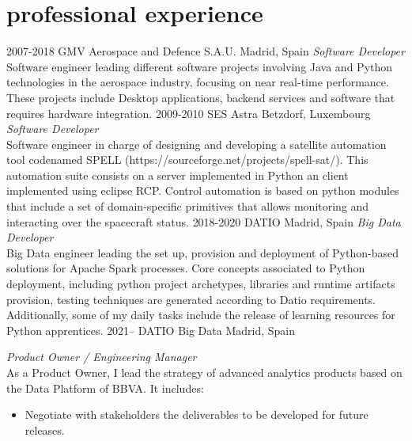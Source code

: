 \documentclass[]{friggeri-cv}
\begin{document}
\clearpage
\section{professional experience}

\begin{entrylist}
\entry
{2007-2018}
{GMV Aerospace and Defence S.A.U.}
{Madrid, Spain}
{\emph{Software Developer} \\
Software engineer leading different software projects involving Java and Python technologies in the aerospace industry, focusing on near real-time performance.
These projects include Desktop applications, backend services and software that requires hardware integration.}
\entry
{2009-2010}
{SES Astra}
{Betzdorf, Luxembourg}
{\emph{Software Developer} \\
Software engineer in charge of designing and developing a satellite automation tool codenamed SPELL (https://sourceforge.net/projects/spell-sat/).
This automation suite consists on a server implemented in Python an client implemented using eclipse RCP.
Control automation is based on python modules that include a set of domain-specific primitives that allows monitoring and interacting over the
spacecraft status.}
\entry
{2018-2020}
{DATIO}
{Madrid, Spain}
{\emph{Big Data Developer} \\
Big Data engineer leading the set up, provision and deployment of Python-based solutions for Apache Spark processes.
Core concepts associated to Python deployment, including python project archetypes, libraries and runtime artifacts provision, testing techniques are
generated according to Datio requirements. Additionally, some of my daily tasks include the release of learning resources for Python apprentices.}
\entry
{2021--}
{DATIO Big Data}
{Madrid, Spain}
{\emph{Product Owner / Engineering Manager} \\
As a Product Owner, I lead the strategy of advanced analytics products based on the Data Platform of BBVA. It includes:
\begin{itemize}
  \item Negotiate with stakeholders the deliverables to be developed for future releases.

\end{itemize}}
\end{entrylist}
\end{document}

